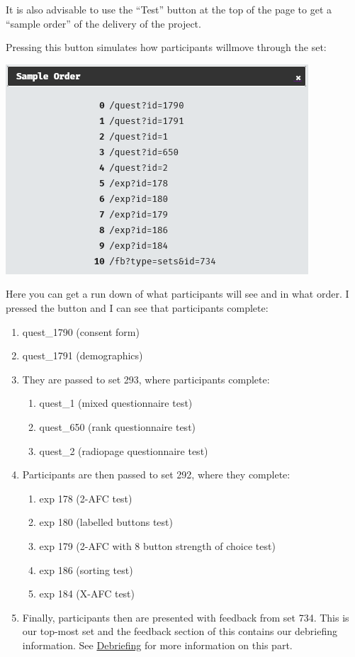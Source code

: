 \documentclass[]{book}
\providecommand{\tightlist}{%
  \setlength{\itemsep}{0pt}\setlength{\parskip}{0pt}}
\begin{document}
It is also advisable to use the ``Test'' button at the top of the page
to get a ``sample order'' of the delivery of the project.

Pressing this button simulates how participants willmove through the
set:

\includegraphics{images/screenshots/sets_14.png}

Here you can get a run down of what participants will see and in what
order. I pressed the button and I can see that participants complete:

\begin{enumerate}
\def\labelenumi{\arabic{enumi}.}
\tightlist
\item
  quest\_1790 (consent form)
\item
  quest\_1791 (demographics)
\item
  They are passed to set 293, where participants complete:

  \begin{enumerate}
  \def\labelenumii{\arabic{enumii}.}
  \tightlist
  \item
    quest\_1 (mixed questionnaire test)
  \item
    quest\_650 (rank questionnaire test)
  \item
    quest\_2 (radiopage questionnaire test)
  \end{enumerate}
\item
  Participants are then passed to set 292, where they complete:

  \begin{enumerate}
  \def\labelenumii{\arabic{enumii}.}
  \tightlist
  \item
    exp 178 (2-AFC test)
  \item
    exp 180 (labelled buttons test)
  \item
    exp 179 (2-AFC with 8 button strength of choice test)
  \item
    exp 186 (sorting test)
  \item
    exp 184 (X-AFC test)
  \end{enumerate}
\item
  Finally, participants then are presented with feedback from set 734.
  This is our top-most set and the feedback section of this contains our
  debriefing information. See \protect\hyperlink{debrief}{Debriefing}
  for more information on this part.
\end{enumerate}
\end{document}

